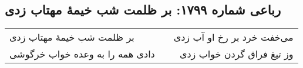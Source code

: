 \begin{center}
\section*{رباعی شماره ۱۷۹۹: بر ظلمت شب خیمهٔ مهتاب زدی}
\label{sec:1799}
\begin{longtable}{l p{0.5cm} r}
بر ظلمت شب خیمهٔ مهتاب زدی
&&
می‌خفت خرد بر رخ او آب زدی
\\
دادی همه را به وعده خواب خرگوشی
&&
وز تیغ فراق گردن خواب زدی
\\
\end{longtable}
\end{center}

